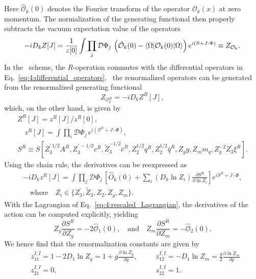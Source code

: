 Here $\hat{\mathcal{O}}_k(0)$ denotes the Fourier transform of the operator $\mathcal{O}_k(x)$ at zero momentum. The normalization of the generating functional then properly subtracts the vacuum expectation value of the operators
\begin{equation}
-i D_k Z[J] = \frac{1}{z[0]}\int \prod_j \mathcal{D} \Phi_j \, \left(\hat{\mathcal{O}}_k(0) - \braket{\Omega | \mathcal{O}_k(0) |\Omega} \right) e^{i (S + J \cdot \Phi)} \equiv Z_{\mathcal{O}_k}.
\end{equation}
In the \MS\ scheme, the $R$-operation commutes with the differential operators in Eq.~\eqref{eq:4:differential_operators}, \ie\ the renormalized operators can be generated from the renormalized generating functional
\begin{equation}
Z_{\mathcal{O}_k^R} = -i D_k Z^R[J],
\end{equation}
which, on the other hand, is given by
\begin{equation}
\begin{gathered}
Z^R[J] = z^R[J]/z^R[0] ,\\
\quad z^R[J] = \int \prod_i \mathcal{D}\Phi_j \, e^{i(S^R + J \cdot \Phi)}, \\
S^R \equiv S[Z_3^{\prime\, 1/2} A^R, Z_3^{\prime\, -1/2} c^R, \tilde{Z}_3^{-1/2}\bar{c}^R, Z_2^{1/2} q^R, Z_2^{1/2} \bar{q}^R, Z_g g, Z_m m_q, Z_g^{-2} Z_3^\prime \xi^R].
\end{gathered}
\end{equation}
Using the chain rule, the derivatives can be reexpressed as
\begin{equation}
\begin{gathered}
-i D_k z^R[J] = \int \prod_j \mathcal{D} \Phi_j \, \left[ \hat{O}_k(0) + \sum_i (D_k \ln Z_i)  \frac{\partial S^R}{\partial \ln Z_i}\right] e^{i S^R + J \cdot \Phi}, \\
\quad \text{where}\quad  Z_i \in \big \lbrace Z_3^\prime , \tilde{Z}_3, Z_2, Z_g, Z_m \big \rbrace.
\end{gathered}
\end{equation}
With the Lagrangian of Eq.~\eqref{eq:4:rescaled_Lagrangian}, the derivatives of the action can be computed explicitly, yielding
\begin{equation}
Z_g \frac{\partial S^R}{\partial Z_g} = - 2 \hat{\mathcal{O}}_1(0), \quad \text{and} \quad Z_m \frac{\partial S^R}{\partial Z_m} = - \hat{\mathcal{O}}_2(0).
\end{equation}
We hence find that the renormalization constants are given by
\begin{equation}
\begin{alignedat}{2}
&z^{I,I}_{11} = 1 - 2 D_1 \ln Z_g = 1 + g\frac{\partial \ln Z_g}{\partial g}, \quad &&z^{I,I}_{12} = - D_1 \ln Z_m = \frac{g}{2} \frac{\partial \ln Z_m}{\partial g} \\
&z^{I,I}_{21} = 0, \quad &&z^{I,I}_{22} = 1.
\end{alignedat}
\label{eq:4:renormalization_matrix_coefficients}
\end{equation}
